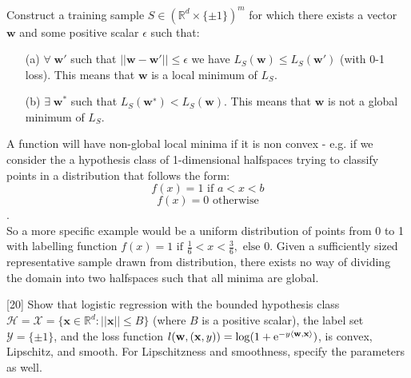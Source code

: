 \documentclass[11pt, fleqn]{exam}
\newenvironment{mathline}{\begin{adjustwidth}{1cm}{}}{\end{adjustwidth}}
\begin{document}
\begin{questions}
Construct a training sample $S \in (\mathbb{R}^d \times \{\pm 1\})^m$ for which there exists a vector $\mathbf{w}$ and some positive scalar $\epsilon$ such that:
\begin{itemize}[nolistsep, noitemsep]
\item[(a)] $\forall \; \mathbf{w}'$ such that $||\mathbf{w} - \mathbf{w}'|| \leq \epsilon$ we have $L_S(\mathbf{w}) \leq L_S(\mathbf{w}')$ (with 0-1 loss). This means that $\mathbf{w}$ is a local minimum of $L_S$.
\item[(b)] $\exists \; \mathbf{w}^*$ such that $L_S(\mathbf{w}^∗) < L_S(\mathbf{w})$. This means that $\mathbf{w}$ is not a global minimum of $L_S$.
\end{itemize}

\begin{mathline}
A function will have non-global local minima if it is non convex - e.g. if we consider the a hypothesis class of 1-dimensional halfspaces trying to classify points in a distribution that follows the form: $$f(x)=1 \text{ if } a<x<b$$ $$f(x)=0 \text{ otherwise}$$.\\
So a more specific example would be a uniform distribution of points from 0 to 1 with labelling function $f(x)=1 \text{ if } \frac{1}{6}<x<\frac{3}{6}, \text{ else } 0$. Given a sufficiently sized representative sample drawn from distribution, there exists no way of dividing the domain into two halfspaces such that all minima are global.
\end{mathline}

[20]
Show that logistic regression with the bounded hypothesis class $\mathcal{H} = \mathcal{X} = \{\mathbf{x} \in \mathbb{R}^d : ||\mathbf{x}|| \leq B\}$ (where $B$ is a positive scalar), the label set $\mathcal{Y} = \{\pm 1\}$, and the loss function $l(\mathbf{w}, (\mathbf{x}, y)) = \log(1 + \textrm{e}^{-y\braket{\mathbf{w}, \mathbf{x}}})$, is convex, Lipschitz, and smooth. For Lipschitzness and smoothness, specify the parameters as well.


\end{questions}
\end{document}
